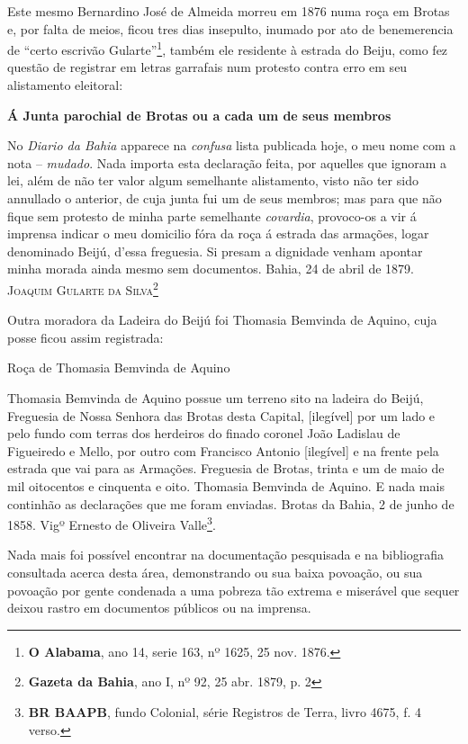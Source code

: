 Este mesmo Bernardino José de Almeida morreu em 1876 numa roça em Brotas e, por falta de meios, ficou tres dias insepulto, inumado por ato de benemerencia de ``certo escrivão Gularte''\footnote{\textbf{O Alabama}, ano 14, serie 163, nº 1625, 25 nov. 1876.}, também ele residente à estrada do Beiju, como fez questão de registrar em letras garrafais num protesto contra erro em seu alistamento eleitoral:

\begin{citacao}
\textbf{Á Junta parochial de Brotas ou a cada um de seus membros}

No \textit{Diario da Bahia} apparece na \textit{confusa} lista publicada hoje, o meu nome com a nota -- \textit{mudado}.
Nada importa esta declaração feita, por aquelles que ignoram a lei, além de não ter valor algum semelhante alistamento, visto não ter sido annullado o anterior, de cuja junta fui um de seus membros; mas para que não fique sem protesto de minha parte semelhante \textit{covardia}, provoco-os a vir á imprensa indicar o meu domicilio fóra da roça á estrada das armações, logar denominado Beijú, d'essa freguesia.
Si presam a dignidade venham apontar minha morada ainda mesmo sem documentos.
Bahia, 24 de abril de 1879.
\textsc{Joaquim Gularte da Silva}\footnote{\textbf{Gazeta da Bahia}, ano I, nº 92, 25 abr. 1879, p. 2}
\end{citacao}

Outra moradora da Ladeira do Beijú foi Thomasia Bemvinda de Aquino, cuja posse ficou assim registrada:

\begin{citacao}
Roça de Thomasia Bemvinda de Aquino

Thomasia Bemvinda de Aquino possue um terreno sito na ladeira do Beijú, Freguesia de Nossa Senhora das Brotas desta Capital, [ilegível] por um lado e pelo fundo com terras dos herdeiros do finado coronel João Ladislau de Figueiredo e Mello, por outro com Francisco Antonio [ilegível] e na frente pela estrada que vai para as Armações. Freguesia de Brotas, trinta e um de maio de mil oitocentos e cinquenta e oito. Thomasia Bemvinda de Aquino. E nada mais continhão as declarações que me foram enviadas. Brotas da Bahia, 2 de junho de 1858. Vigº Ernesto de Oliveira Valle\footnote{\textbf{BR BAAPB}, fundo Colonial, série Registros de Terra, livro 4675, f. 4 verso.}. 
\end{citacao}

Nada mais foi possível encontrar na documentação pesquisada e na bibliografia consultada acerca desta área, demonstrando ou sua baixa povoação, ou sua povoação por gente condenada a uma pobreza tão extrema e miserável que sequer deixou rastro em documentos públicos ou na imprensa.

